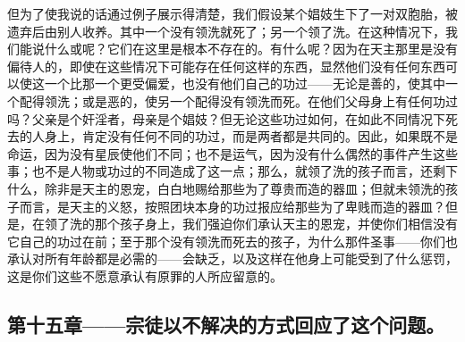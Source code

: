 但为了使我说的话通过例子展示得清楚，我们假设某个娼妓生下了一对双胞胎，被遗弃后由别人收养。其中一个没有领洗就死了；另一个领了洗。在这种情况下，我们能说什么或呢？它们在这里是根本不存在的。有什么呢？因为在天主那里是没有偏待人的，即使在这些情况下可能存在任何这样的东西，显然他们没有任何东西可以使这一个比那一个更受偏爱，也没有他们自己的功过——无论是善的，使其中一个配得领洗；或是恶的，使另一个配得没有领洗而死。在他们父母身上有任何功过吗？父亲是个奸淫者，母亲是个娼妓？但无论这些功过如何，在如此不同情况下死去的人身上，肯定没有任何不同的功过，而是两者都是共同的。因此，如果既不是命运，因为没有星辰使他们不同；也不是运气，因为没有什么偶然的事件产生这些事；也不是人物或功过的不同造成了这一点；那么，就领了洗的孩子而言，还剩下什么，除非是天主的恩宠，白白地赐给那些为了尊贵而造的器皿；但就未领洗的孩子而言，是天主的义怒，按照团块本身的功过报应给那些为了卑贱而造的器皿？但是，在领了洗的那个孩子身上，我们强迫你们承认天主的恩宠，并使你们相信没有它自己的功过在前；至于那个没有领洗而死去的孩子，为什么那件圣事——你们也承认对所有年龄都是必需的——会缺乏，以及这样在他身上可能受到了什么惩罚，这是你们这些不愿意承认有原罪的人所应留意的。\par


\subsection{第十五章——宗徒以不解决的方式回应了这个问题。}

